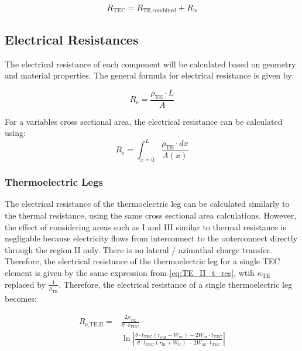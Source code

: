 \documentclass[10pt,a4paper,twocolumn]{article}
\begin{document}
\begin{equation}
	R_{\text{TEC}} = R_{\text{TE,combined}} + R_{\text{is}}
	\label{eq:TEC_element_Resistance}
\end{equation}

\subsection{Electrical Resistances}

The electrical resistance of each component will be calculated based on geometry and material properties. The general formula for electrical resistance is given by:

\begin{equation}
	R_{\text{e}} = \frac{\rho_{\text{TE}} \cdot L}{A}
\end{equation}

For a variables cross sectional area, the electrical resistance can be calculated using:
\begin{equation}
	R_{\text{e}} = \int_{x=0}^{L} \frac{\rho_{\text{TE}} \cdot dx}{A(x)}
	\label{eq:e_resistance_int}
\end{equation}

\subsubsection{Thermoelectric Legs}

The electrical resistance of the thermoelectric leg can be calculated similarly to the thermal resistance, using the same cross sectional area calculations. However, the effect of considering areas such as I and III similar to thermal resistance is negligable because electricity flows from interconnect to the outerconnect directly through the region II only. There is no lateral / azimuthal charge transfer. Therefore, the electrical resistance of the thermoelectric leg for a single TEC element is given by the same expression from \cref{eq:TE_II_t_res}, wtih $\kappa_{\text{TE}}$ replaced by $\frac{1}{\rho_{\text{TE}}}$. Therefore, the electrical resistance of a single thermoelectric leg becomes:

\begin{equation}
	\begin{aligned}
		R_{\text{e,TE,II}} = & \frac{2\rho_{\text{TE}}}{ \theta \cdot t_{\text{TEC}}} \cdot \\ & \ln \left| \frac{\theta \cdot t_{\text{TEC}} (r_{\text{out}}-W_{\text{oc}}) - 2 W_{\text{az}} \cdot t_{\text{TEC}}}{\theta \cdot t_{\text{TEC}} (r_{\text{in}}+W_{\text{ic}}) - 2 W_{\text{az}} \cdot t_{\text{TEC}}} \right|
		\label{eq:TE_e_res}
	\end{aligned}
\end{equation}
\end{document}
